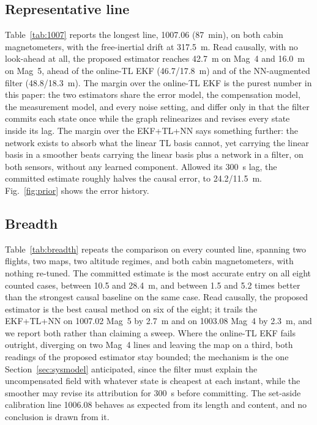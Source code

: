 
\subsection{Representative line}\label{sec:repline}
Table~\ref{tab:1007} reports the longest line, 1007.06 (\SI{87}{\minute}), on
both cabin magnetometers, with the free-inertial drift at \SI{317.5}{\meter}.
Read causally, with no look-ahead at all, the proposed estimator reaches
\SI{42.7}{\meter} on Mag~4 and \SI{16.0}{\meter} on Mag~5, ahead of the
online-TL EKF (\num{46.7}/\SI{17.8}{\meter}) and of the NN-augmented filter
(\num{48.8}/\SI{18.3}{\meter}). The margin over the online-TL EKF is the purest
number in this paper: the two estimators share the error model, the
compensation model, the measurement model, and every noise setting, and differ
only in that the filter commits each state once while the graph relinearizes
and revises every state inside its lag. The margin over the EKF+TL+NN says
something further: the network exists to absorb what the linear TL basis
cannot, yet carrying the linear basis in a smoother beats carrying the linear
basis plus a network in a filter, on both sensors, without any learned
component. Allowed its \SI{300}{\second} lag, the committed estimate roughly
halves the causal error, to \num{24.2}/\SI{11.5}{\meter}. Fig.~\ref{fig:prior}
shows the error history.

\subsection{Breadth}\label{sec:breadth}
Table~\ref{tab:breadth} repeats the comparison on every counted line, spanning
two flights, two maps, two altitude regimes, and both cabin magnetometers, with
nothing re-tuned. The committed estimate is the most accurate entry on all
eight counted cases, between \SI{10.5}{} and \SI{28.4}{\meter}, and between
\num{1.5} and \num{5.2} times better than the strongest causal baseline on the
same case. Read causally, the proposed estimator is the best causal method on
six of the eight; it trails the EKF+TL+NN on 1007.02 Mag~5 by \SI{2.7}{\meter}
and on 1003.08 Mag~4 by \SI{2.3}{\meter}, and we report both rather than
claiming a sweep. Where the online-TL EKF fails outright, diverging on two
Mag~4 lines and leaving the map on a third, both readings of the proposed
estimator stay bounded; the mechanism is the one
Section~\ref{sec:sysmodel} anticipated, since the filter must explain the
uncompensated field with whatever state is cheapest at each instant, while the
smoother may revise its attribution for \SI{300}{\second} before committing.
The set-aside calibration line 1006.08 behaves as expected from its length and
content, and no conclusion is drawn from it.

